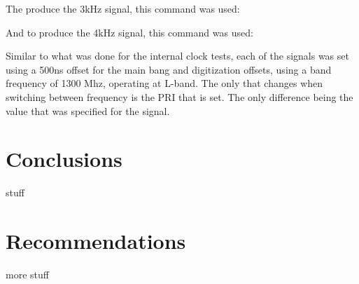 \documentclass[12pt, a4paper]{article}
\begin{document}
The produce the 3kHz signal, this command was used:


And to produce the 4kHz signal, this command was used:


Similar to what was done for the internal clock tests, each of the signals was set using a 500ns offset for the main bang and digitization offsets, using a band frequency of 1300 Mhz, operating at L-band. The only that changes when switching between frequency is the PRI that is set. The only difference being the value that was specified for the signal.



\section{Conclusions}

stuff

\section{Recommendations}

more stuff
\end{document}
